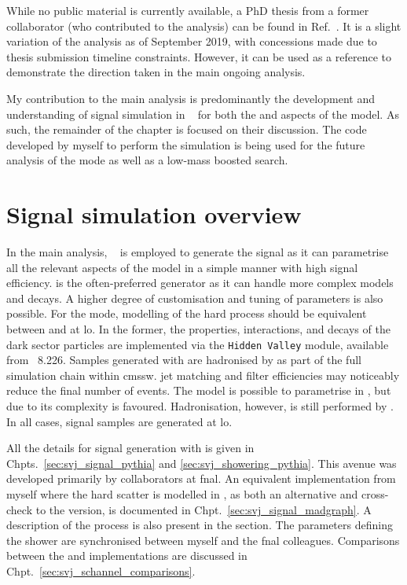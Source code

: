 While no public material is currently available, a PhD thesis from a former collaborator (who contributed to the \schannel analysis) can be found in Ref.~. It is a slight variation of the \schannel analysis as of September 2019, with concessions made due to thesis submission timeline constraints. However, it can be used as a reference to demonstrate the direction taken in the main ongoing analysis.

My contribution to the main analysis is predominantly the development and understanding of signal simulation in \MGvATNLO~\cite{Alwall:2011madgraph} for both the \schannel and \tchannel aspects of the model. As such, the remainder of the chapter is focused on their discussion. The code developed by myself to perform the simulation is being used for the future analysis of the \tchannel mode as well as a low-mass boosted \PZprime search.




\section{Signal simulation overview}
\label{sec:signal_sim}

In the main analysis, \PYTHIAEIGHT~\cite{pythia82} is employed to generate the \schannel signal as it can parametrise all the relevant aspects of the model in a simple manner with high signal efficiency. \MADGRAPH is the often-preferred generator as it can handle more complex models and decays. A higher degree of customisation and tuning of parameters is also possible. For the \schannel mode, modelling of the hard process should be equivalent between \PYTHIA and \MADGRAPH at \acrfull{lo}. In the former, the properties, interactions, and decays of the dark sector particles are implemented via the \texttt{Hidden Valley} module, available from \PYTHIA~8.226. Samples generated with \MADGRAPH are hadronised by \PYTHIA as part of the full simulation chain within \acrshort{cmssw}. \Gls{jet} matching and filter efficiencies may noticeably reduce the final number of events. The \tchannel model is possible to parametrise in \PYTHIA, but due to its complexity \MADGRAPH is favoured. Hadronisation, however, is still performed by \PYTHIA. In all cases, signal samples are generated at \acrshort{lo}.

All the details for \schannel signal generation with \PYTHIAEIGHT is given in Chpts.~\ref{sec:svj_signal_pythia} and \ref{sec:svj_showering_pythia}. This avenue was developed primarily by collaborators at \acrshort{fnal}. An equivalent implementation from myself where the hard scatter is modelled in \MGvATNLO, as both an alternative and cross-check to the \PYTHIA version, is documented in Chpt.~\ref{sec:svj_signal_madgraph}. A description of the \tchannel process is also present in the section. The parameters defining the shower are synchronised between myself and the \acrshort{fnal} colleagues. Comparisons between the \PYTHIA and \MADGRAPH implementations are discussed in Chpt.~\ref{sec:svj_schannel_comparisons}.

